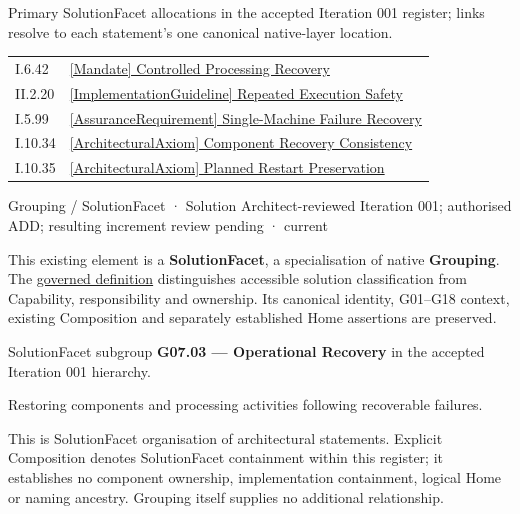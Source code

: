 Primary SolutionFacet allocations in the accepted Iteration 001 register; links resolve to each statement’s one canonical native-layer location.\par
\begin{longtable}{p{.22\linewidth}p{.73\linewidth}}
I.6.42 & \hyperref[element:014a4549398d49ee81eadb7108598f48]{[Mandate] Controlled Processing Recovery} \\
II.2.20 & \hyperref[element:be3bd95296c2427a870980a0e12adb41]{[ImplementationGuideline] Repeated Execution Safety} \\
I.5.99 & \hyperref[element:0d13da9390a3438ca887a4293bb034b9]{[AssuranceRequirement] Single-Machine Failure Recovery} \\
I.10.34 & \hyperref[element:545465b03f794a509c932bd3126fbe57]{[ArchitecturalAxiom] Component Recovery Consistency} \\
I.10.35 & \hyperref[element:0ce24ee595a445e5b1a95e54aa9f1eac]{[ArchitecturalAxiom] Planned Restart Preservation} \\
\end{longtable}
\label{element:8609b046777c4a8ab4d5cafb30e34d04}
{\small Grouping / SolutionFacet · Solution Architect-reviewed Iteration 001; authorised ADD; resulting increment review pending · current}\par

This existing element is a \textbf{SolutionFacet}, a specialisation of native
\textbf{Grouping}. The \href{\detokenize{../../../../../../../governance/continuum-representation.md#solutionfacet-classification--1119-candidate}}{governed definition}
distinguishes accessible solution classification from Capability, responsibility
and ownership. Its canonical identity, G01–G18 context, existing Composition
and separately established Home assertions are preserved.



SolutionFacet subgroup \textbf{G07.03 — Operational Recovery} in the accepted Iteration 001 hierarchy.



Restoring components and processing activities following recoverable failures.



This is SolutionFacet organisation of architectural statements. Explicit Composition denotes SolutionFacet containment within this register; it establishes no component ownership, implementation containment, logical Home or naming ancestry. Grouping itself supplies no additional relationship.


